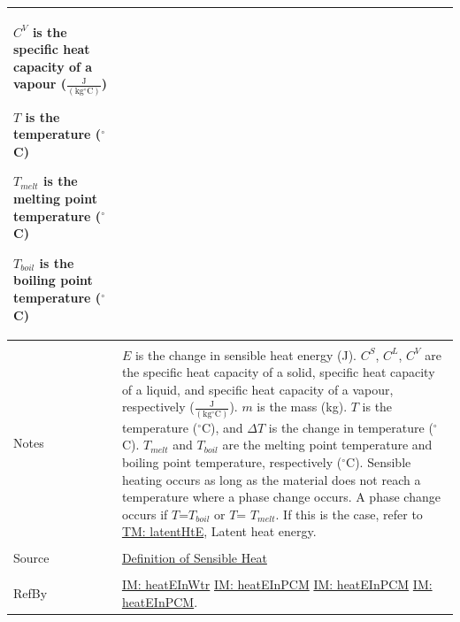 \documentclass[12pt]{article}
\begin{document}
\begin{minipage}{\textwidth}
\begin{tabular}{p{} p{}}
\begin{symbDescription}
                                 \item{${C^{V}}$ is the specific heat capacity of a vapour ($\frac{\text{J}}{(\text{kg}{}^{\circ}\text{C})}$)}
                                 \item{$T$ is the temperature (${}^{\circ}$C)}
                                 \item{${T_{melt}}$ is the melting point temperature (${}^{\circ}$C)}
                                 \item{${T_{boil}}$ is the boiling point temperature (${}^{\circ}$C)}
                                 \end{symbDescription}
                                 \\ \midrule \\
                                 Notes & $E$ is the change in sensible heat energy (J). ${C^{S}}$, ${C^{L}}$, ${C^{V}}$ are the specific heat capacity of a solid, specific heat capacity of a liquid, and specific heat capacity of a vapour, respectively ($\frac{\text{J}}{(\text{kg}{}^{\circ}\text{C})}$). $m$ is the mass (kg). $T$ is the temperature (${}^{\circ}$C), and $ΔT$ is the change in temperature (${}^{\circ}$C). ${T_{melt}}$ and ${T_{boil}}$ are the melting point temperature and boiling point temperature, respectively (${}^{\circ}$C). Sensible heating occurs as long as the material does not reach a temperature where a phase change occurs. A phase change occurs if $T$=${T_{boil}}$ or $T$= ${T_{melt}}$. If this is the case, refer to \hyperref[TM:latentHtE]{TM: latentHtE}, Latent heat energy.
                                         \\ \midrule \\
                                         Source & \hyperref[http://en.wikipedia.org/wiki/Sensible_heat]{Definition of Sensible Heat}
                                                  \\ \midrule \\
                                                  RefBy & \hyperref[IM:heatEInWtr]{IM: heatEInWtr} \hyperref[IM:heatEInPCM]{IM: heatEInPCM} \hyperref[IM:heatEInPCM]{IM: heatEInPCM} \hyperref[IM:heatEInPCM]{IM: heatEInPCM}.
\\ \bottomrule \end{tabular}
\end{minipage}\\
~\newline
\end{document}
